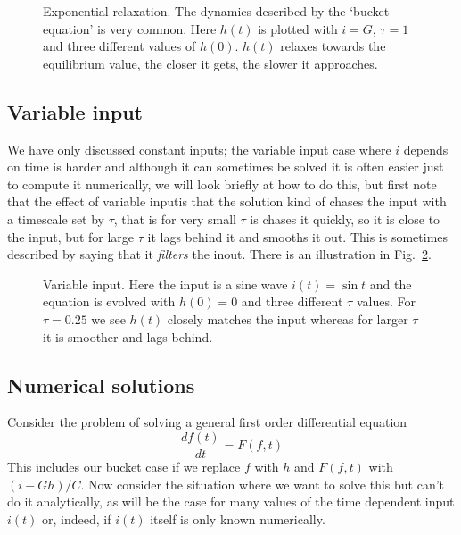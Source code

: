 \documentclass[11pt,a4paper]{scrartcl}
\begin{document}
\begin{figure}
\begin{center}

\end{center}
\caption{Exponential relaxation. The dynamics described by the
  \lq{}bucket equation\rq{} is very common. Here
  $h(t)$ is plotted with
  $i=G$, $\tau=1$ and three different values of
  $h(0)$. $h(t)$ relaxes towards the equilibrium value, the closer it gets, the slower it approaches.\label{bucket_v}}
\end{figure}

\subsection*{Variable input}

We have only discussed constant inputs; the variable input case where
$i$ depends on time is harder and although it can sometimes be solved
it is often easier just to compute it numerically, we will look
briefly at how to do this, but first note that the effect of variable
inputis that the solution kind of chases the input with a timescale
set by $\tau$, that is for very small $\tau$ is chases it quickly, so
it is close to the input, but for large $\tau$ it lags behind it and
smooths it out. This is sometimes described by saying that it
\textsl{filters} the inout. There is an illustration in
Fig.~\ref{chasing}.

\begin{figure}
\begin{center}

\end{center}
\caption{Variable input. Here the input is a sine wave $i(t)=\sin{t}$
  and the equation is evolved with $h(0)=0$ and three different $\tau$
  values. For $\tau=0.25$ we see $h(t)$ closely matches the input
  whereas for larger $\tau$ it is smoother and lags
  behind.\label{chasing}}
\end{figure}


\subsection*{Numerical solutions}

Consider the problem of solving a general first order differential equation
\begin{equation}
\frac{df(t)}{dt}=F(f,t)
\end{equation}
This includes our bucket case if we replace $f$ with $h$ and $F(f,t)$
with $(i-Gh)/C$. Now consider the situation where we want to solve
this but can't do it analytically, as will be the case for many
values of the time dependent input $i(t)$ or, indeed, if $i(t)$ itself
is only known numerically. 
\end{document}
